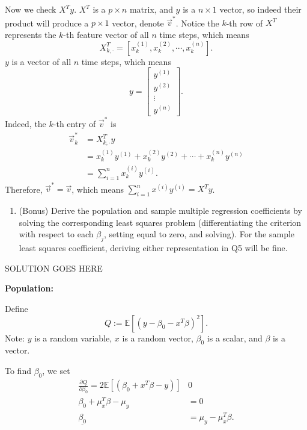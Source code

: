 \documentclass[
]{article}
\providecommand{\tightlist}{%
  \setlength{\itemsep}{0pt}\setlength{\parskip}{0pt}}
\begin{document}
Now we check \(X^Ty\). \(X^T\) is a \(p\times n\) matrix, and \(y\) is a
\(n\times 1\) vector, so indeed their product will produce a
\(p\times 1\) vector, denote \(\vec{v}^*\). Notice the \(k\)-th row of
\(X^T\) represents the \(k\)-th feature vector of all \(n\) time steps,
which means
\[X^T_{k,\cdot} = \left[x_k^{(1)}, x_k^{(2)}, \cdots, x_k^{(n)}\right].\]
\(y\) is a vector of all \(n\) time steps, which means
\[y = \begin{bmatrix}
    y^{(1)} \\
    y^{(2)} \\
    \vdots \\
    y^{(n)}
  \end{bmatrix}.\] Indeed, the \(k\)-th entry of \(\vec{v}^*\) is
\begin{align*}
    \vec{v}^*_k & = X^T_{k,\cdot}y \\
    & = x_k^{(1)}y^{(1)} + x_k^{(2)}y^{(2)} + \cdots + x_k^{(n)}y^{(n)} \\
    & = \sum_{i=1}^{n}x_k^{(i)}y^{(i)}.
\end{align*} Therefore, \(\vec{v}^* = \vec{v}\), which means
\(\sum_{i=1}^{n}x^{(i)}y^{(i)} = X^Ty\).

\begin{enumerate}
\def\labelenumi{\arabic{enumi}.}
\setcounter{enumi}{5}
\tightlist
\item
  (Bonus) Derive the population and sample multiple regression
  coefficients by solving the corresponding least squares problem
  (differentiating the criterion with respect to each \(\beta_j\),
  setting equal to zero, and solving). For the sample least squares
  coefficient, deriving either representation in Q5 will be fine.
\end{enumerate}

SOLUTION GOES HERE

\textbf{Population:}

Define \[Q:=\mathbb{E}\left[(y-\beta_0-x^T\beta)^2\right].\] Note: \(y\)
is a random variable, \(x\) is a random vector, \(\beta_0\) is a scalar,
and \(\beta\) is a vector.

To find \(\beta_0\), we set \begin{align*}
    \frac{\partial Q}{\partial \beta_0} = 2\mathbb{E}\left[(\beta_0+x^T\beta-y)\right] & 0 \\
    \beta_0 + \mu_x^T\beta - \mu_y & = 0 \\
    \underline{\beta_0} & = \mu_y - \mu_x^T\beta.
\end{align*}
\end{document}
